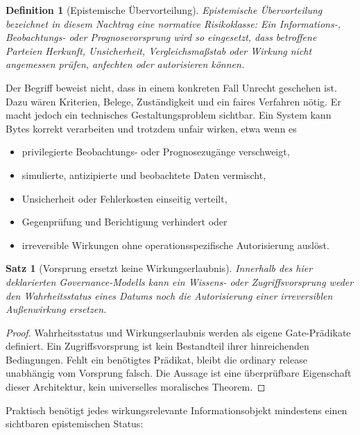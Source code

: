 \documentclass[11pt,a4paper]{article}
\newtheorem{definition}{Definition}[section]
\newtheorem{satz}{Satz}[section]
\theoremstyle{remark}
\begin{document}
\begin{definition}[Epistemische Übervorteilung]
Epistemische Übervorteilung bezeichnet in diesem Nachtrag eine normative
Risikoklasse: Ein Informations-, Beobachtungs- oder Prognosevorsprung wird so
eingesetzt, dass betroffene Parteien Herkunft, Unsicherheit, Vergleichsmaßstab
oder Wirkung nicht angemessen prüfen, anfechten oder autorisieren können.
\end{definition}

Der Begriff beweist nicht, dass in einem konkreten Fall Unrecht geschehen
ist. Dazu wären Kriterien, Belege, Zuständigkeit und ein faires Verfahren
nötig. Er macht jedoch ein technisches Gestaltungsproblem sichtbar. Ein
System kann Bytes korrekt verarbeiten und trotzdem unfair wirken, etwa wenn
es

\begin{itemize}
  \item privilegierte Beobachtungs- oder Prognosezugänge verschweigt,
  \item simulierte, antizipierte und beobachtete Daten vermischt,
  \item Unsicherheit oder Fehlerkosten einseitig verteilt,
  \item Gegenprüfung und Berichtigung verhindert oder
  \item irreversible Wirkungen ohne operationsspezifische Autorisierung
    auslöst.
\end{itemize}

\begin{satz}[Vorsprung ersetzt keine Wirkungserlaubnis]
Innerhalb des hier deklarierten Governance-Modells kann ein Wissens- oder
Zugriffsvorsprung weder den Wahrheitsstatus eines Datums noch die
Autorisierung einer irreversiblen Außenwirkung ersetzen.
\end{satz}

\begin{proof}
Wahrheitsstatus und Wirkungserlaubnis werden als eigene Gate-Prädikate
definiert. Ein Zugriffsvorsprung ist kein Bestandteil ihrer hinreichenden
Bedingungen. Fehlt ein benötigtes Prädikat, bleibt die ordinary release
unabhängig vom Vorsprung falsch. Die Aussage ist eine überprüfbare
Eigenschaft dieser Architektur, kein universelles moralisches Theorem.
\end{proof}

Praktisch benötigt jedes wirkungsrelevante Informationsobjekt mindestens
einen sichtbaren epistemischen Status:
\end{document}
